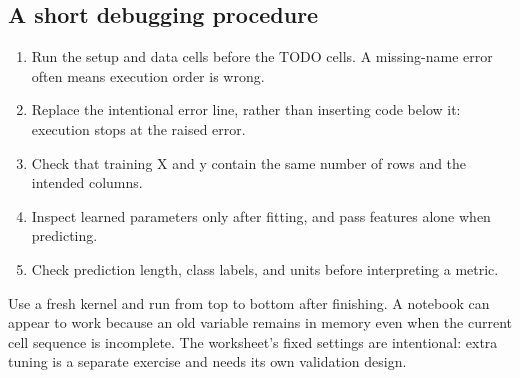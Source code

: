\subsection*{A short debugging procedure}
\begin{enumerate}
\item Run the setup and data cells before the TODO cells. A missing-name error often means execution order is wrong.
\item Replace the intentional error line, rather than inserting code below it: execution stops at the raised error.
\item Check that training X and y contain the same number of rows and the intended columns.
\item Inspect learned parameters only after fitting, and pass features alone when predicting.
\item Check prediction length, class labels, and units before interpreting a metric.
\end{enumerate}
Use a fresh kernel and run from top to bottom after finishing. A notebook can appear to work because an old
variable remains in memory even when the current cell sequence is incomplete. The worksheet's fixed settings
are intentional: extra tuning is a separate exercise and needs its own validation design.


